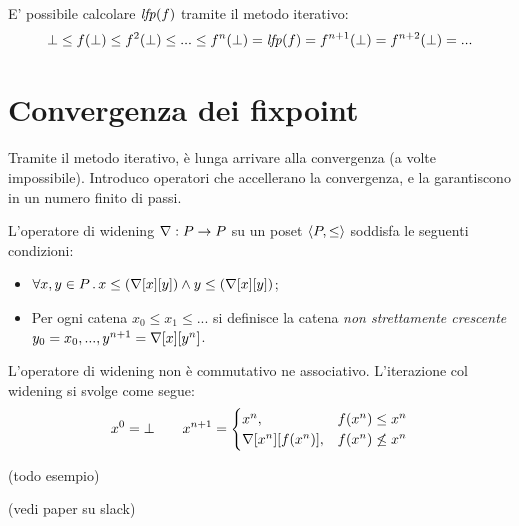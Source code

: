 E' possibile calcolare $\mathit{lfp}(f)$ tramite il metodo iterativo:
$$\bot \le f(\bot) \le f^2(\bot) \le ... \le f^n(\bot) = \mathit{lfp}(f) = f^{n+1}(\bot) = f^{n+2}(\bot) = ...$$

\section{Convergenza dei fixpoint}

Tramite il metodo iterativo, è lunga arrivare alla convergenza (a volte impossibile). Introduco operatori che accellerano la convergenza, e la garantiscono in un numero finito di passi.

\begin{definition}
L'operatore di widening $\nabla: P \to P$ su un poset $\langle P, \le \rangle$ soddisfa le seguenti condizioni:
\begin{itemize}
    \item $\forall x,y \in P \, . \, x \le (\nabla[x][y]) \land y \le (\nabla[x][y])$;
    \item Per ogni catena $x_0 \le x_1 \le ...$ si definisce la catena \emph{non strettamente crescente} $y_0 = x_0, ..., y^{n+1} = \nabla[x][y^n]$.
\end{itemize}
\end{definition}

L'operatore di widening non è commutativo ne associativo. L'iterazione col widening si svolge come segue:
$$x^0 = \bot \qquad x^{n+1} = \begin{cases} 
    x^n,                & f(x^n) \le x^n \\ 
    \nabla[x^n][f(x^n)], & f(x^n) \not\le x^n \\
\end{cases}$$

(todo esempio)

(vedi paper su slack)